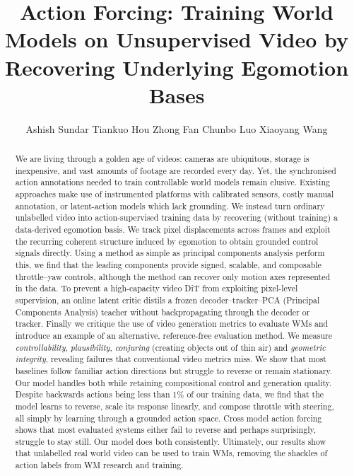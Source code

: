 \documentclass[letterpaper]{article} %
\title{Action Forcing: Training World Models on Unsupervised Video by Recovering Underlying Egomotion Bases}
\author{
    Ashish Sundar
    Tiankuo Hou
    Zhong Fan
    Chunbo Luo
    Xiaoyang Wang
}
\begin{document}
\maketitle

\begin{abstract}
We are living through a golden age of videos: cameras are ubiquitous,
storage is inexpensive, and vast amounts of footage are recorded every day.
Yet, the synchronised action annotations needed to train controllable world
models remain elusive. Existing approaches make use of instrumented
platforms with calibrated sensors, costly manual
annotation, or latent-action models which lack grounding. We instead turn ordinary unlabelled video into
action-supervised training data by recovering (without training) a data-derived egomotion basis. We track pixel displacements across frames and exploit the recurring coherent
structure induced by egomotion to obtain grounded control signals directly. Using a method as simple as principal components analysis perform this, we find that the leading components
provide signed, scalable, and composable throttle--yaw controls, although the
method can recover only motion axes represented in the data. To prevent a high-capacity video DiT from
exploiting pixel-level supervision, an online latent critic distils a frozen
decoder--tracker--PCA (Principal Components Analysis) teacher without backpropagating through the decoder or
tracker. Finally we critique the use of video generation metrics to evaluate WMs and introduce an example of an alternative, reference-free evaluation method. We measure \textit{controllability}, \textit{plausibility}, \textit{conjuring} (creating objects out of thin air) and \textit{geometric integrity}, revealing failures that conventional video metrics miss.
We show that most baselines follow familiar action directions but struggle to reverse or remain stationary. Our model handles both while retaining compositional control and generation quality. Despite backwards actions being less than $1\%$ of our training data, we find that the model learns to reverse, scale its response linearly, and compose throttle with steering, all simply by learning through a grounded action space. Cross model action forcing shows that most evaluated systems either fail to reverse and perhaps surprisingly, struggle to stay still. Our model does both consistently.
Ultimately, our results show that unlabelled real world video can be used to train WMs, removing the shackles of action labels from WM research and training.
\end{abstract}
\end{document}
